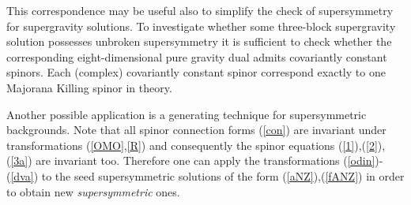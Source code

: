 \documentclass[a4paper,12pt]{article}
\begin{document}
This correspondence may be useful also to simplify the check of
supersymmetry for \coordHE{} supergravity solutions. To investigate
whether some three-block \coordHE{} supergravity solution possesses
unbroken supersymmetry it is sufficient to check whether the
corresponding eight-dimensional pure gravity dual admits
covariantly constant spinors. Each (complex) \coordHE{} covariantly
constant spinor correspond exactly to one Majorana Killing
spinor in \coordHE{} theory.

Another possible application is a generating technique for
supersymmetric \coordHE{} backgrounds. Note that all spinor connection
forms (\ref{con}) are invariant under \coordHE{} transformations
(\ref{OMO},\ref{R}) and consequently \coordHE{} the spinor equations
(\ref{1}),(\ref{2}),(\ref{3a}) are invariant too. Therefore one
can apply the \coordHE{} transformations (\ref{odin})-(\ref{dva})
to the seed \coordHE{} supersymmetric solutions of the form
(\ref{aNZ}),(\ref{fANZ}) in order to obtain new {\it
supersymmetric} ones.


\end{document}
